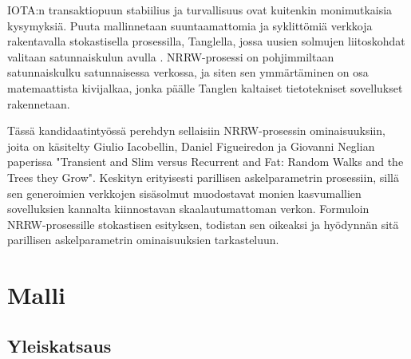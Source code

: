 \documentclass[finnish, 12pt, a4paper, sci, utf8, pdfa]{aaltothesis}
\begin{document}
IOTA:n transaktiopuun stabiilius ja turvallisuus ovat kuitenkin monimutkaisia kysymyksiä. Puuta mallinnetaan suuntaamattomia ja syklittömiä verkkoja rakentavalla stokastisella prosessilla, 
Tanglella, jossa uusien solmujen liitoskohdat valitaan satunnaiskulun avulla \cite{Popov-tangle}. NRRW-prosessi on pohjimmiltaan satunnaiskulku satunnaisessa verkossa, ja siten 
sen ymmärtäminen on osa matemaattista kivijalkaa, jonka päälle Tanglen kaltaiset tietotekniset sovellukset rakennetaan.

Tässä kandidaatintyössä perehdyn sellaisiin NRRW-prosessin ominaisuuksiin, joita on käsitelty Giulio Iacobellin, Daniel Figueiredon ja Giovanni Neglian paperissa "Transient and Slim 
versus Recurrent and Fat: Random Walks and the Trees they Grow". Keskityn erityisesti parillisen askelparametrin prosessiin, sillä sen generoimien verkkojen sisäsolmut muodostavat 
monien kasvumallien sovelluksien kannalta kiinnostavan skaalautumattoman verkon. Formuloin NRRW-prosessille stokastisen esityksen, todistan sen oikeaksi ja hyödynnän sitä parillisen askelparametrin ominaisuuksien tarkasteluun.

\clearpage

\section{Malli}

\subsection{Yleiskatsaus}
\end{document}
